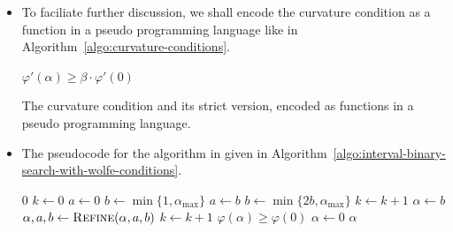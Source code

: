 \documentclass[10pt]{article}
\begin{document}
\begin{itemize}
    \item To faciliate further discussion, we shall encode the curvature condition as a function in a pseudo programming language like in Algorithm~\ref{algo:curvature-conditions}.
    
    \begin{algorithm}[t]
        \begin{algorithmic}
                \State \Return $\varphi'(\alpha) \geq \beta \cdot \varphi'(0)$
            \EndProcedure            
        \end{algorithmic}
        \caption{The curvature condition and its strict version, encoded as functions in a pseudo programming language.}
        \label{algo:curvature-conditions}
    \end{algorithm}

    \item The pseudocode for the algorithm in given in Algorithm~\ref{algo:interval-binary-search-with-wolfe-conditions}.    
    
    \begin{algorithm}[t]        
        \begin{algorithmic}
                \State \Return $0$
            \EndIf
            \State $k \gets 0$
            \State $a \gets 0$
            \State $b \gets \min\{1, \alpha_{\max}\}$
                \State $a \gets b$
                \State $b \gets \min\{2b, \alpha_{\max}\}$
                \State $k \gets k+1$            
            \EndWhile
            \State $\alpha \gets b$
                \State $\alpha, a, b \gets \Call{Refine}{\alpha,a,b}$
                \State $k \gets k+1$
            \EndWhile
            \If $\varphi(\alpha) \geq \varphi(0)$
                \State $\alpha \gets 0$
            \EndIf
            \State \Return $\alpha$            
            \EndProcedure                                    

            \State


\end{algorithmic}
\end{algorithm}
\end{itemize}
\end{document}
